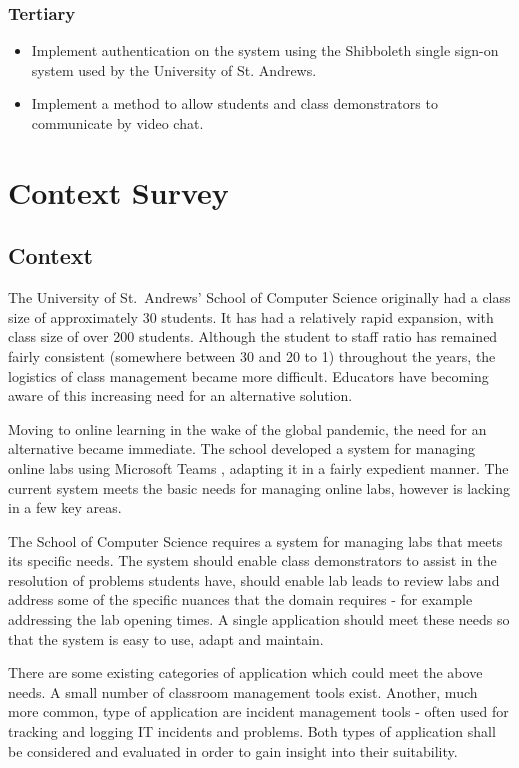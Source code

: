 \documentclass[a4paper,11pt]{article}
\begin{document}
\subsubsection{Tertiary}
\begin{itemize}
    \item Implement authentication on the system using the Shibboleth single sign-on system used by the University of St. Andrews.
    \item Implement a method to allow students and class demonstrators to communicate by video chat. 
\end{itemize}

\newpage
\section{Context Survey}

\subsection{Context}

The University of St.\ Andrews' School of Computer Science originally had a class size of approximately 30 students. It has had a relatively rapid expansion, with class size of over 200 students. Although the student to staff ratio has remained fairly consistent (somewhere between 30 and 20 to 1) throughout the years, the logistics of class management became more difficult. Educators have becoming aware of this increasing need for an alternative solution.

Moving to online learning in the wake of the global pandemic, the need for an alternative became immediate. The school developed a system for managing online labs using Microsoft Teams \cite{teams}, adapting it in a fairly expedient manner. The current system meets the basic needs for managing online labs, however is lacking in a few key areas.  

The School of Computer Science requires a system for managing labs that meets its specific needs. The system should enable class demonstrators to assist in the resolution of problems students have, should enable lab leads to review labs and address some of the specific nuances that the domain requires - for example addressing the lab opening times. A single application should meet these needs so that the system is easy to use, adapt and maintain.

There are some existing categories of application which could meet the above needs. A small number of classroom management tools exist. Another, much more common, type of application are incident management tools - often used for tracking and logging IT incidents and problems. Both types of application shall be considered and evaluated in order to gain insight into their suitability.
 
\end{document}
